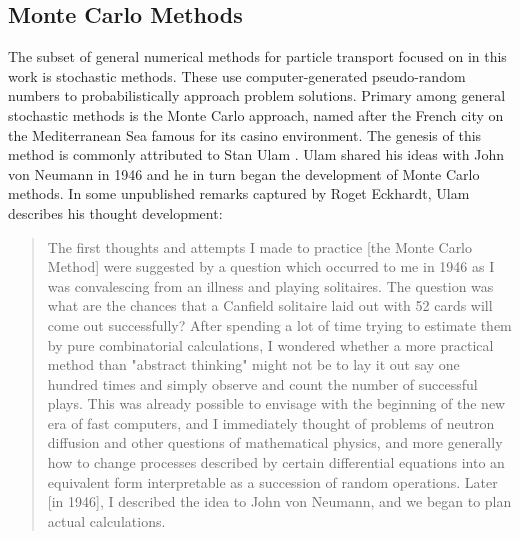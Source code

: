 \subsection{Monte Carlo Methods} \label{montecarlo}
The subset of general numerical methods for particle transport focused on in this work is stochastic methods.  These use computer-generated pseudo-random numbers to probabilistically approach problem solutions.  Primary among general stochastic methods is the Monte Carlo approach, named after the French city on the Mediterranean Sea famous for its casino environment.  The genesis of this method is commonly attributed to Stan Ulam \cite{eckardt}.  Ulam shared his ideas with John von Neumann in 1946 and he in turn began the development of Monte Carlo methods.  In some unpublished remarks captured by Roget Eckhardt, Ulam describes his thought development:
\begin{quote}
The first thoughts and attempts I made to practice [the Monte Carlo Method] were suggested by a question which occurred to me in 1946 as I was convalescing from an illness and playing solitaires. The question was what are the chances that a Canfield solitaire laid out with 52 cards will come out successfully? After spending a lot of time trying to estimate them by pure combinatorial calculations, I wondered whether a more practical method than "abstract thinking" might not be to lay it out say one hundred times and simply observe and count the number of successful plays. This was already possible to envisage with the beginning of the new era of fast computers, and I immediately thought of problems of neutron diffusion and other questions of mathematical physics, and more generally how to change processes described by certain differential equations into an equivalent form interpretable as a succession of random operations. Later [in 1946], I described the idea to John von Neumann, and we began to plan actual calculations. \cite{eckardt}
\end{quote}

